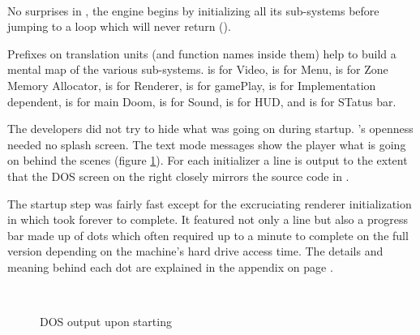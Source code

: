 \\
\par
{}
\par
No surprises in , the engine begins by initializing all its sub-systems before jumping to a loop which will never return ().\\
\par
Prefixes on translation units (and function names inside them) help to build a mental map of the various sub-systems.  is for Video,  is for Menu,  is for Zone Memory Allocator,  is for Renderer,  is for gamePlay,  is for Implementation dependent,  is for main Doom,  is for Sound,  is for HUD, and  is for STatus bar.\\
\par
The developers did not try to hide what was going on during startup. \doom's openness needed no splash screen. The text mode messages show the player what is going on behind the scenes (figure \ref{dosloading}). For each initializer a line is output to the extent that the DOS screen on the right closely mirrors the source code in .\\
\par
The startup step was fairly fast except for the excruciating renderer initialization in  which took forever to complete. It featured not only a line but also a progress bar made up of dots which often required up to a minute to complete on the full version depending on the machine's hard drive access time. The details and meaning behind each dot are explained in the appendix on page \pageref{dots_explained}.\\
\par
{}\\
\begin{figure}[H]
\caption{DOS output upon starting }
\label{dosloading}
\end{figure}

